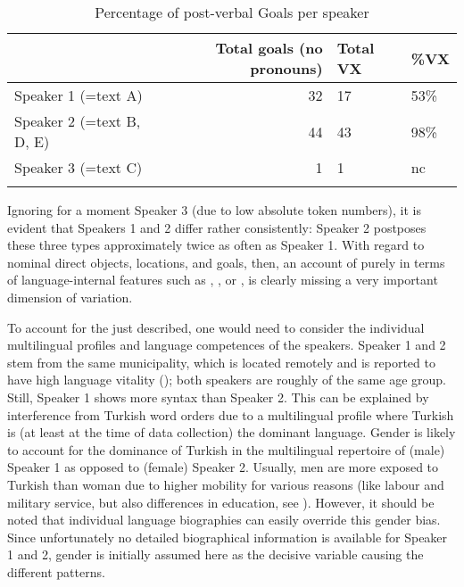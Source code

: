 \documentclass[output=paper,colorlinks,citecolor=brown]{langscibook}
\begin{document}
\begin{table}
\begin{tabularx}{\textwidth}{lrYY}
\lsptoprule
 & Total goals (no pronouns) & Total VX & \%VX \\
\midrule
Speaker 1 (=text A) & 32 & 17 & 53\% \\
Speaker 2 (=text B, D, E) & 44 & 43 & 98\% \\
Speaker 3 (=text C) & 1 & 1 & nc \\
\lspbottomrule
\end{tabularx}
\caption{Percentage of post-verbal Goals per speaker}
\label{Romeyka:tab:4}
\end{table}

Ignoring for a moment Speaker 3 (due to low absolute token numbers), it is evident that Speakers 1 and 2 differ rather consistently: Speaker 2 postposes these three  types approximately twice as often as Speaker 1. With regard to nominal direct objects, locations, and goals, then, an account of  purely in terms of language-internal features such as , , or , is clearly missing a very important dimension of variation.

To account for the  just described, one would need to consider the individual multilingual profiles and language competences of the speakers. Speaker 1 and 2 stem from the same municipality, which is located remotely and is reported to have high language vitality (\citealt{schreiber2016assessing}); both speakers are roughly of the same age group. Still, Speaker 1 shows more  syntax than Speaker 2. This can be explained by interference from Turkish  word orders due to a multilingual profile where Turkish is (at least at the time of data collection) the dominant language. Gender is likely to account for the dominance of Turkish in the multilingual repertoire of (male) Speaker 1 as opposed to (female) Speaker 2. Usually, men are more exposed to Turkish than woman due to higher mobility for various reasons (like labour and military service, but also differences in education, see \citealt{schreiber2016assessing}). However, it should be noted that individual language biographies can easily override this gender bias. Since unfortunately no detailed biographical information is available for Speaker 1 and 2, gender is initially assumed here as the decisive variable causing the different  patterns.
\end{document}
